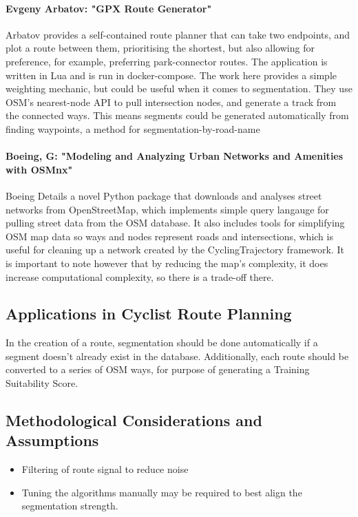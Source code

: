 \documentclass[12pt,a4paper]{article}
\begin{document}
\paragraph{Evgeny Arbatov: "GPX Route Generator"}
Arbatov provides a self-contained route planner that can take two endpoints, and plot a route between them, prioritising the shortest, but also allowing for preference, for example, preferring park-connector routes.
The application is written in Lua and is run in docker-compose. The work here provides a simple weighting mechanic, but could be useful when it comes to segmentation.
They use OSM's nearest-node API to pull intersection nodes, and generate a track from the connected ways. This means segments could be generated automatically from finding waypoints, a method for segmentation-by-road-name

\paragraph{Boeing, G: "Modeling and Analyzing Urban Networks and Amenities with OSMnx"}
Boeing Details a novel Python package that downloads and analyses street networks from OpenStreetMap, which implements simple query langauge for pulling street data from the OSM database. It also includes tools for simplifying OSM map data so
ways and nodes represent roads and intersections, which is useful for cleaning up a network created by the CyclingTrajectory framework. It is important to note however that by reducing the map's complexity, it does increase computational complexity, so there is a trade-off there.



\subsection{Applications in Cyclist Route Planning}
In the creation of a route, segmentation should be done automatically if a segment doesn't already exist in the database. Additionally, each route should be converted to
a series of OSM ways, for purpose of generating a Training Suitability Score.

\subsection{Methodological Considerations and Assumptions}
\begin{itemize}
	\item Filtering of route signal to reduce noise
	\item Tuning the algorithms manually may be required to best align the segmentation strength.
\end{itemize}
\newpage
\end{document}
